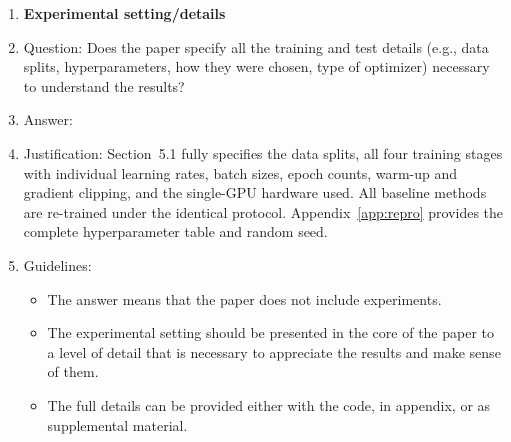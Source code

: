 \begin{enumerate}
\item {\bf Experimental setting/details}
    \item[] Question: Does the paper specify all the training and test details (e.g., data splits, hyperparameters, how they were chosen, type of optimizer) necessary to understand the results?
    \item[] Answer: \answerYes{}
    \item[] Justification: Section~5.1 fully specifies the data splits, all four training stages with individual learning rates, batch sizes, epoch counts, warm-up and gradient clipping, and the single-GPU hardware used. All baseline methods are re-trained under the identical protocol. Appendix~\ref{app:repro} provides the complete hyperparameter table and random seed.
    \item[] Guidelines:
    \begin{itemize}
        \item The answer \answerNA{} means that the paper does not include experiments.
        \item The experimental setting should be presented in the core of the paper to a level of detail that is necessary to appreciate the results and make sense of them.
        \item The full details can be provided either with the code, in appendix, or as supplemental material.
    \end{itemize}


\end{enumerate}
